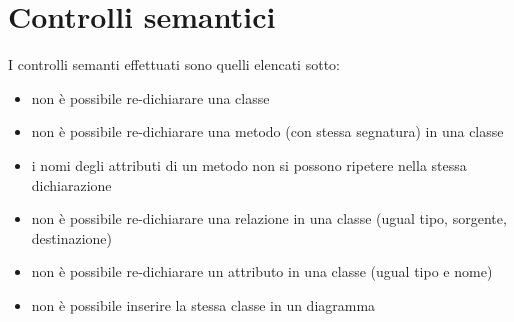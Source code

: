 \section{Controlli semantici}

I controlli semanti effettuati sono quelli elencati sotto:
\begin{itemize}
   \item non è possibile re-dichiarare una classe
   \item non è possibile re-dichiarare una metodo (con stessa segnatura) in una
   classe
   \item i nomi degli attributi di un metodo non si possono ripetere nella stessa dichiarazione
   \item non è possibile re-dichiarare una relazione in una classe (ugual tipo,
   sorgente, destinazione)
   \item non è possibile re-dichiarare un attributo in una classe (ugual tipo e
   nome)
   \item non è possibile inserire la stessa classe in un diagramma 
\end{itemize}
